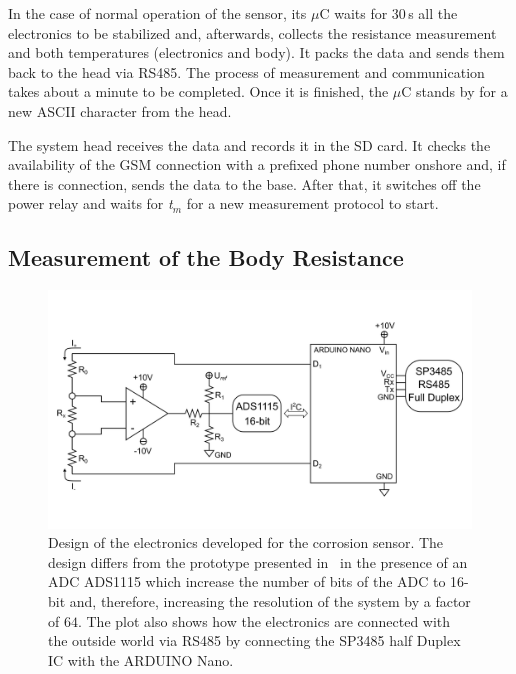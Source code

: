 \documentclass[journal,twoside,web]{ieeecolor}
\begin{document}
In the case of normal operation of the sensor, its $\mu$C waits for $30$\,s all the electronics to be stabilized and, afterwards, collects the resistance measurement and both temperatures (electronics and body). It packs the data and sends them back to the head via RS485. The process of measurement and communication takes about a minute to be completed. Once it is finished, the $\mu$C stands by for a new ASCII character from the head.

The system head receives the data and records it in the SD card. It checks the availability of the GSM connection with a prefixed phone number onshore and, if there is connection, sends the data to the base. After that, it switches off the power relay and waits for \textit{t$_{m}$} for a new measurement protocol to start.
\vspace{0.5cm}
\subsection{Measurement of the Body Resistance}
\label{ssec:resMeasProt}

\begin{figure}[!t]
\centering
\includegraphics[trim = 0mm 0mm 0mm 0mm, clip, width=1\columnwidth]{images/fig3_V2.pdf}
\caption{Design of the electronics developed for the corrosion sensor. The design differs from the prototype presented in~\cite{bengtsson2012} in the presence of an ADC ADS1115 which increase the number of bits of the ADC to 16-bit and, therefore, increasing the resolution of the system by a factor of $64$. The plot also shows how the electronics are connected with the outside world via RS485 by connecting the SP3485 half Duplex IC with the ARDUINO Nano.}
\label{fig:resMeasProt}
\vspace{-0.3cm}
\end{figure}
\end{document}
